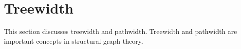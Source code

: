 \section{Treewidth}\label{chap:treewidth}
This section discusses treewidth and pathwidth. Treewidth and pathwidth are important concepts in structural graph theory.


